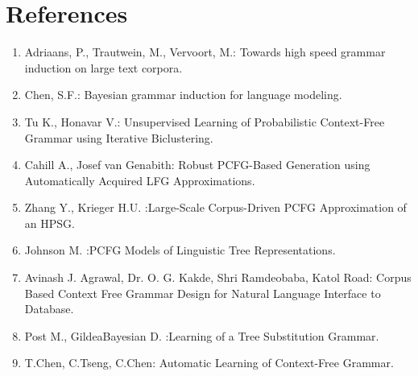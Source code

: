 \documentclass[paper=a4, fontsize=11pt]{scrartcl} %
\numberwithin{equation}{section} %
\numberwithin{figure}{section} %
\numberwithin{table}{section} %
\begin{document}
\section{References}
\begin{enumerate}[1. ]
\item Adriaans, P., Trautwein, M., Vervoort, M.: Towards high speed grammar induction on large text corpora.
\item Chen, S.F.: Bayesian grammar induction for language modeling.
\item Tu K., Honavar V.: Unsupervised Learning of Probabilistic Context-Free Grammar using Iterative Biclustering.
\item Cahill A., Josef van Genabith: Robust PCFG-Based Generation using Automatically Acquired LFG Approximations.
\item Zhang Y., Krieger H.U. :Large-Scale Corpus-Driven PCFG Approximation of an HPSG.
\item Johnson M. :PCFG Models of Linguistic Tree Representations.
\item Avinash J. Agrawal, Dr. O. G. Kakde, Shri Ramdeobaba, Katol Road: Corpus Based Context Free Grammar Design for Natural Language Interface to Database.
\item Post M., GildeaBayesian D. :Learning of a Tree Substitution Grammar.
\item T.Chen, C.Tseng, C.Chen: Automatic Learning of Context-Free Grammar.
\end{enumerate}
\end{document}
